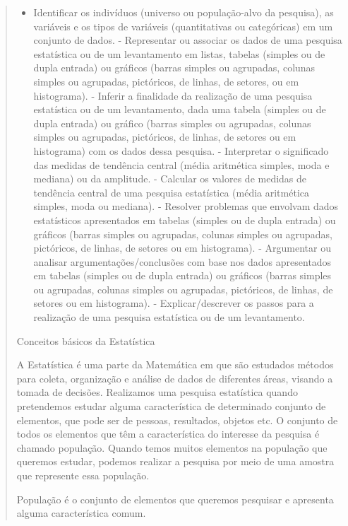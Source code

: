 \begin{quote}
\begin{escolha}
\begin{itemize}
\tightlist
\item
  Identificar os indivíduos (universo ou população-alvo da pesquisa), as
  variáveis e os tipos de variáveis (quantitativas ou categóricas) em um
  conjunto de dados. - Representar ou associar os dados de uma pesquisa
  estatística ou de um levantamento em listas, tabelas (simples ou de
  dupla entrada) ou gráficos (barras simples ou agrupadas, colunas
  simples ou agrupadas, pictóricos, de linhas, de setores, ou em
  histograma). - Inferir a finalidade da realização de uma pesquisa
  estatística ou de um levantamento, dada uma tabela (simples ou de
  dupla entrada) ou gráfico (barras simples ou agrupadas, colunas
  simples ou agrupadas, pictóricos, de linhas, de setores ou em
  histograma) com os dados dessa pesquisa. - Interpretar o significado
  das medidas de tendência central (média aritmética simples, moda e
  mediana) ou da amplitude. - Calcular os valores de medidas de
  tendência central de uma pesquisa estatística (média aritmética
  simples, moda ou mediana). - Resolver problemas que envolvam dados
  estatísticos apresentados em tabelas (simples ou de dupla entrada) ou
  gráficos (barras simples ou agrupadas, colunas simples ou agrupadas,
  pictóricos, de linhas, de setores ou em histograma). - Argumentar ou
  analisar argumentações/conclusões com base nos dados apresentados em
  tabelas (simples ou de dupla entrada) ou gráficos (barras simples ou
  agrupadas, colunas simples ou agrupadas, pictóricos, de linhas, de
  setores ou em histograma). - Explicar/descrever os passos para a
  realização de uma pesquisa estatística ou de um levantamento.
\end{itemize}

Conceitos básicos da Estatística

A Estatística é uma parte da Matemática em que são estudados métodos
para coleta, organização e análise de dados de diferentes áreas, visando
a tomada de decisões. Realizamos uma pesquisa estatística quando
pretendemos estudar alguma característica de determinado conjunto de
elementos, que pode ser de pessoas, resultados, objetos etc. O conjunto
de todos os elementos que têm a característica do interesse da pesquisa
é chamado população. Quando temos muitos elementos na população que
queremos estudar, podemos realizar a pesquisa por meio de uma amostra
que represente essa população.

População é o conjunto de elementos que queremos pesquisar e apresenta
alguma característica comum.


\end{escolha}
\end{quote}
